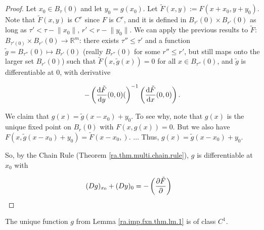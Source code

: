 \begin{proof}

Let \(x_0 \in B_\tau(0)\) and let \(y_0 = g(x_0)\). Let \(\tilde{F}(x,y) := F(x + x_0, y + y_0)\). Note that \(\tilde{F}(x,y)\) is \(C^r\) since \(F\) is \(C^r\), and it is defined in \(B_{\tau'}(0) \times B_{r'}(0)\) as long as \(\tau' < \tau - \lVert x_0 \rVert\), \(r' < r - \lVert y_0 \rVert\). We can apply the previous results to \(\tilde{F}\): \(B_{\tau'(0)} \times B_{r'}(0) \to \mathbb{R}^m\): there exists \(\tau'' \leq \tau'\) and a function \(\tilde{g} = B_{\tau''}(0) \mapsto B_{r'}(0)\) (really \(B_{r''}(0)\) for some \(r'' \leq r'\), but still maps onto the larger set \(B_{r'}(0)\)) such that \(\tilde{F}(x, \tilde{g}(x)) = 0\) for all \(x \in B_{\tau''}(0)\), and \(\tilde{g}\) is differentiable at 0, with derivative

\[
- \left( \deriv{\tilde{F}}{y} (0, 0) ( \right)^{-1} \left( \deriv{\tilde{F}}{x} (0, 0) \right).
\]

We claim that \(g(x) = \tilde{g}(x-x_0) + y_0\). To see why, note that \(g(x)\) is the unique fixed point on \(B_r(0)\) with \(F(x,g(x)) = 0\). But we also have \(F(x, \tilde{g}(x-x_0) + y_0) = \tilde{F}(x - x_0, )\). \(\ldots\) Thus, \(g(x) = \tilde{g}(x -x_0) + y_0\).

So, by the Chain Rule (Theorem \ref{ra.thm.multi.chain.rule}), \(g\) is differentiable at \(x_0\) with 

\begin{align*}
(Dg)_{x_0} + (Dy)_0 & = - \left( \pderiv{\tilde{F}}{} \right)
\end{align*}

\end{proof}

\begin{lemma}

The unique function \(g\) from Lemma \ref{ra.imp.fxn.thm.lm.1} is of class \(C^1\).

\end{lemma}


